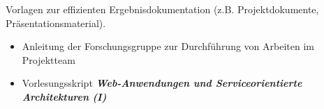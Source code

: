 \begin{course}
\begin{content}
\end{content}

\begin{media}Vorlagen zur effizienten Ergebnisdokumentation (z.B. Projektdokumente, Präsentationsmaterial).

\end{media}

\begin{literature}\begin{itemize}\item Anleitung der Forschungsgruppe zur Durchführung von Arbeiten im Projektteam  \item Vorlesungsskript \textbf{\emph{Web-Anwendungen und Serviceorientierte Architekturen}\emph{ (I)}}  \end{itemize}\end{literature}



\end{course}